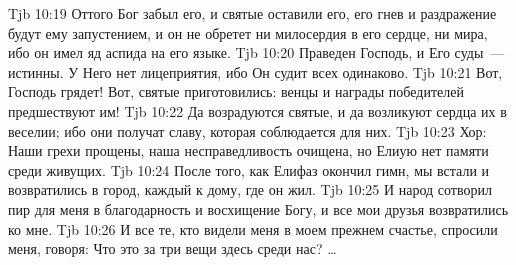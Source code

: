 \vs Tjb 10:19
Оттого Бог забыл его, и святые оставили его, его гнев и раздражение будут ему запустением, и он не обретет ни милосердия в его сердце, ни мира, ибо он имел яд аспида на его языке.
\vs Tjb 10:20
Праведен Господь, и Его суды~--- истинны. У Него нет лицеприятия, ибо Он судит всех одинаково.
\vs Tjb 10:21
Вот, Господь грядет! Вот, святые приготовились: венцы и награды победителей предшествуют им!
\vs Tjb 10:22
Да возрадуются святые, и да возликуют сердца их в веселии; ибо они получат славу, которая соблюдается для них.
\vs Tjb 10:23
Хор: Наши грехи прощены, наша несправедливость очищена, но Елиую нет памяти среди живущих.
\vs Tjb 10:24
После того, как Елифаз окончил гимн, мы встали и возвратились в город, каждый к дому, где он жил.
\vs Tjb 10:25
И народ сотворил пир для меня в благодарность и восхищение Богу, и все мои друзья возвратились ко мне.
\vs Tjb 10:26
И все те, кто видели меня в моем прежнем счастье, спросили меня, говоря: Что это за три вещи здесь среди нас? \ldots

